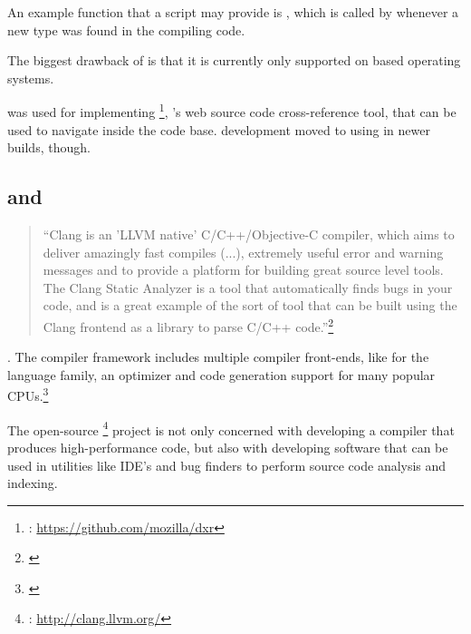 An example function that a script may provide is , which is called by  whenever a new type was found in the compiling code.

The biggest drawback of  is that it is currently only supported on  based operating systems.

 was used for implementing \footnote{: \url{https://github.com/mozilla/dxr}}, 's web source code cross-reference tool, that can be used to navigate inside the  code base.  development moved to using  in newer builds, though.

\subsection{ and }
\label{sec:Clang}

\begin{quotation}
``Clang is an 'LLVM native' C/C++/Objective-C compiler, which aims to deliver amazingly fast compiles (...), extremely useful error and warning messages and to provide a platform for building great source level tools. The Clang Static Analyzer is a tool that automatically finds bugs in your code, and is a great example of the sort of tool that can be built using the Clang frontend as a library to parse C/C++ code.''\footnote{\citep{LLVMHP}}
\end{quotation}

. The  compiler framework includes multiple compiler front-ends, like  for the  language family, an optimizer and code generation support for many popular CPUs.\footnote{\citep{LLVMHP}}

The open-source \footnote{: \url{http://clang.llvm.org/}} project is not only concerned with developing a compiler that produces high-performance code, but also with developing software that can be used in utilities like IDE's and bug finders to perform source code analysis and indexing.

